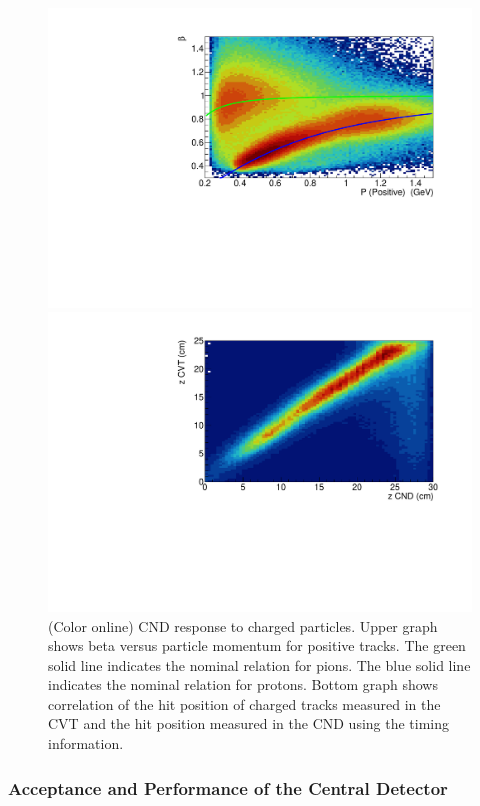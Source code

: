 \documentclass[final,3p,twocolumn]{elsarticle}
\begin{document}
\begin{figure}[t!]
\centerline{\includegraphics[width=1.1\columnwidth]{CND-betaP.pdf}}
\centerline{\includegraphics[width=1.1\columnwidth]{CND-z.pdf}}
\caption{(Color online) CND response to charged particles. Upper graph shows beta versus particle momentum for positive tracks. 
The green solid line indicates the nominal relation for pions. The blue solid line indicates the nominal relation for protons. Bottom graph shows correlation of the hit position of charged tracks measured in the CVT and the hit position measured 
in the CND using the timing information.}
\label{cnd-performance}
\end{figure}

\subsubsection{Acceptance and Performance of the Central Detector} 
\end{document}

